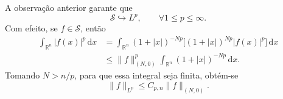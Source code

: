 \documentclass[../distribution_theory_notes.tex]{subfiles}
\begin{document}
\begin{tcolorbox}[
		skin=enhanced,
		title=Observação,
		fonttitle=\bfseries,
		colframe=black,
		colbacktitle=cyan!75!white,
		colback=cyan!15,
		colbacklower=black,
		coltitle=black,
		drop fuzzy shadow
	]
	A observação anterior garante que
	\[
		\mathcal{S}\hookrightarrow L^{p},\qquad \forall 1\leq p\leq \infty .
	\]
	Com efeito, se \(f\in \mathcal{S}\), então
	\begin{align*}
		\int_{\mathbb{R}^{n}}|f(x)|^{p}\,\mathrm{d}x
		 & =\int_{\mathbb{R}^{n}}(1+|x|)^{-Np}\bigl[(1+|x|)^{Np}|f(x)|^{p}\bigr] \,\mathrm{d}x \\
		 & \leq \|f\|_{(N,0)}^{p}\int_{\mathbb{R}^{n}}(1+|x|)^{-Np}\,\mathrm{d}x.
	\end{align*}
	Tomando \(N>n/p\), para que essa integral seja finita, obtém-se
	\[
		\|f\|_{L^{p}}\leq C_{p,n}\|f\|_{(N,0)}.
	\]
\end{tcolorbox}
\end{document}
